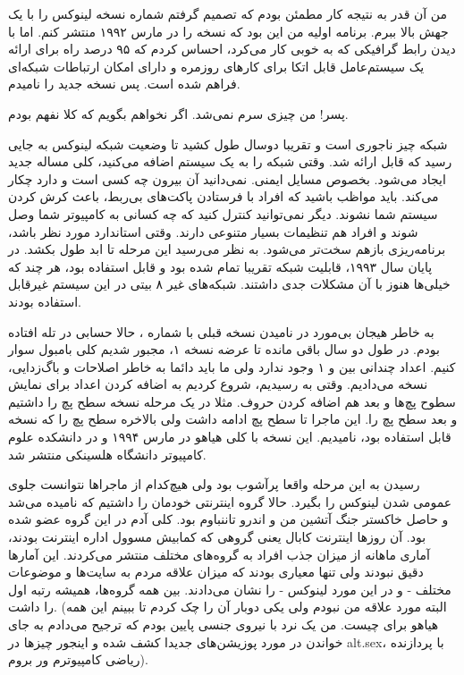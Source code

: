 من آن قدر به نتیجه کار مطمئن بودم که تصمیم گرفتم شماره نسخه لینوکس را
با یک جهش بالا ببرم. برنامه اولیه من این بود که نسخه  را در
مارس ۱۹۹۲ منتشر کنم. اما با دیدن رابط گرافیکی که به خوبی کار می‌کرد،
احساس کردم که ۹۵ درصد راه برای ارائه یک سیستم‌عامل قابل اتکا برای
کارهای روزمره و دارای امکان ارتباطات شبکه‌ای فراهم شده است. پس نسخه
جدید را  نامیدم.

پسر! من چیزی سرم نمی‌شد. اگر نخواهم بگویم که کلا نفهم بودم. 

شبکه چیز ناجوری است و تقریبا دوسال طول کشید تا وضعیت شبکه لینوکس به
جایی رسید که قابل ارائه شد. وقتی شبکه را به یک سیستم اضافه می‌کنید، کلی
مساله جدید ایجاد می‌شود. بخصوص مسایل ایمنی. نمی‌دانید آن بیرون چه کسی
است و دارد چکار می‌کند. باید مواظب باشید که افراد با فرستادن پاکت‌های
بی‌ربط، باعث کرش کردن سیستم شما نشوند. دیگر نمی‌توانید کنترل کنید که چه
کسانی به کامپیوتر شما وصل شوند و افراد هم تنظیمات بسیار متنوعی
دارند. وقتی استاندارد مورد نظر  باشد، برنامه‌ریزی بازهم
سخت‌تر می‌شود. به نظر می‌رسید این مرحله تا ابد طول بکشد. در پایان سال
۱۹۹۳، قابلیت شبکه تقریبا تمام شده بود و قابل استفاده بود، هر چند که
خیلی‌ها هنوز با آن مشکلات جدی داشتند. شبکه‌های غیر ۸ بیتی در این سیستم
غیرقابل استفاده بودند.

به خاطر هیجان بی‌مورد در نامیدن نسخه قبلی با شماره ، حالا
حسابی در تله افتاده بودم. در طول دو سال باقی مانده تا عرضه نسخه ۱،
مجبور شدیم کلی بامبول سوار کنیم. اعداد چندانی بین  و ۱ وجود
ندارد ولی ما باید دائما به خاطر اصلاحات و باگ‌زدایی، نسخه می‌دادیم. وقتی
به  رسیدیم، شروع کردیم به اضافه کردن اعداد برای نمایش سطوح
پچ‌ها و بعد هم اضافه کردن حروف. مثلا در یک مرحله نسخه  سطح
پچ  را داشتیم و بعد  سطح پچ  را. این
ماجرا تا سطح پچ  ادامه داشت ولی بالاخره سطح پچ  را
که نسخه قابل استفاده بود،  نامیدیم. این نسخه با کلی هیاهو در
مارس ۱۹۹۴ و در دانشکده علوم کامپیوتر دانشگاه هلسینکی منتشر شد.

رسیدن به این مرحله واقعا پرآشوب بود ولی هیچ‌کدام از ماجراها نتوانست
جلوی عمومی شدن لینوکس را بگیرد. حالا گروه اینترنتی خودمان را داشتیم که
 نامیده می‌شد و حاصل خاکستر جنگ آتشین من و اندرو
تاننباوم بود. کلی آدم در این گروه عضو شده بود. آن روزها اینترنت
کابال یعنی گروهی که کمابیش مسوول اداره
اینترنت بودند، آماری ماهانه از میزان جذب افراد به گروه‌های مختلف منتشر
می‌کردند. این آمارها دقیق نبودند ولی تنها معیاری بودند که میزان علاقه
مردم به سایت‌ها و موضوعات مختلف - و در این مورد لینوکس - را نشان
می‌دادند. بین همه گروه‌ها،  همیشه رتبه اول را داشت. (البته
مورد علاقه من نبودم ولی یکی دوبار آن را چک کردم تا ببینم این همه هیاهو
برای چیست. من یک نرد با نیروی جنسی پایین بودم که ترجیح می‌دادم به جای
خواندن در مورد پوزیشن‌های جدیدا کشف شده و اینجور چیزها در alt.sex، با
پردازنده ریاضی کامپیوترم ور بروم).

